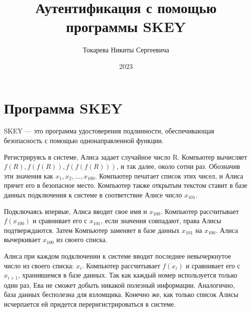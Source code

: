 \documentclass[bachelor, och, labwork]{shiza}
\begin{document}
\title{Аутентификация с помощью программы SKEY}





\author{Токарева Никиты Сергеевича}




\date{2023}

\maketitle




\section*{Программа SKEY}

SKEY --- это программа удостоверения подлинности, обеспечивающая безопасность с помощью однонаправленной функции. 

Регистрируясь в системе, Алиса задает случайное число R. Компьютер вычисляет $f(R), f(f(R)), f(f(f(R)))$, и так 
далее, около сотни раз. Обозначив эти значения как $x_1, x_2, ..., x_{100}$. Компьютер печатает список этих чисел, 
и Алиса прячет его в безопасное место. 
Компьютер также открытым текстом ставит в базе данных подключения к системе в соответствие Алисе число $x_{101}$.

Подключаясь впервые, Алиса вводит свое имя и $x_{100}$. Компьютер рассчитывает $f(x_{100})$ и сравнивает его с $x_{101}$, 
если значения совпадают, права Алисы подтверждаются. 
Затем Компьютер заменяет в базе данных $x_{101}$ на $x_{100}$. Алиса вычеркивает $x_{100}$ из своего списка.

Алиса при каждом подключении к системе вводит последнее невычеркнутое число из своего списка: $x_i$. Компьютер 
рассчитывает $f(x_i)$ и сравнивает его с $x_{i+1}$, хранившемся в базе данных. Так как каждый номер используется 
только один раз, Ева не сможет добыть никакой полезный информации. Аналогично, база данных бесполезна для взломщика. 
Конечно же, как только список Алисы исчерпается ей придется переригистрироваться в системе.
\end{document}
